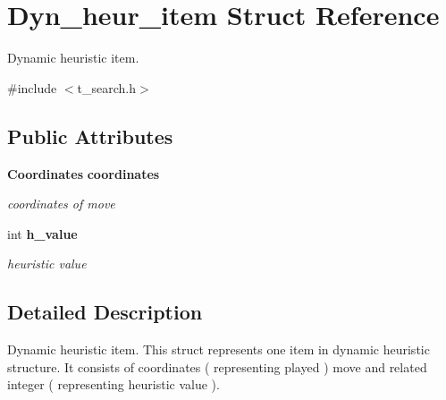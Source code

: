 \section{Dyn\_\-heur\_\-item Struct Reference}
\label{structDyn__heur__item}


Dynamic heuristic item.  




{\ttfamily \#include $<$t\_\-search.h$>$}

\subsection*{Public Attributes}
\begin{DoxyCompactItemize}
\item 
{\bf Coordinates} {\bf coordinates}\label{structDyn__heur__item_aa2fed69003caa634b4a9058cd9f9a040}

\begin{DoxyCompactList}\small\item\em coordinates of move \item\end{DoxyCompactList}\item 
int {\bf h\_\-value}\label{structDyn__heur__item_a797f9aa64e3bca2c19864738850b7ee2}

\begin{DoxyCompactList}\small\item\em heuristic value \item\end{DoxyCompactList}\end{DoxyCompactItemize}


\subsection{Detailed Description}
Dynamic heuristic item. This struct represents one item in dynamic heuristic structure. It consists of coordinates ( representing played ) move and related integer ( representing heuristic value ). 